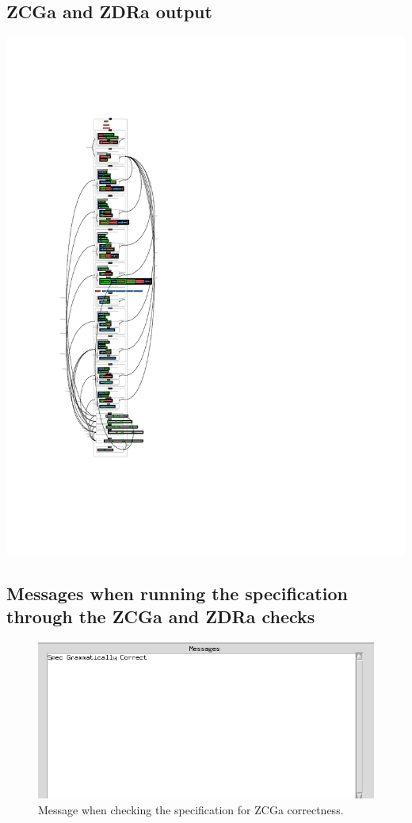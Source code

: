 \subsection{ZCGa and ZDRa output}
\noindent \includegraphics[clip, trim=0cm 4cm 6cm 4.2cm]{examples/nonworkzdra/1n2.pdf}

\subsection{Messages when running the specification through the ZCGa and ZDRa checks}

\begin{figure}[H]
\includegraphics[scale=0.7]{examples/nonworkzdra/correct.png}
\caption{Message when checking the specification for ZCGa correctness.}
\end{figure}

